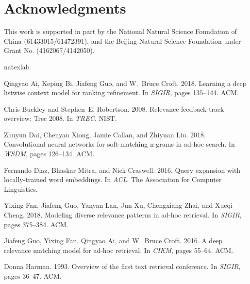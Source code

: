 \documentclass[11pt,a4paper]{article}
\begin{document}
\section*{Acknowledgments}
This work is supported in part by the National Natural Science Foundation of China (61433015/61472391), and the Beijing Natural Science Foundation under Grant No. (4162067/4142050).


\begin{thebibliography}{32}
	\expandafter\ifx\csname natexlab\endcsname\relax\def\natexlab#1{#1}\fi
	
	Qingyao Ai, Keping Bi, Jiafeng Guo, and W.~Bruce Croft. 2018.
	\newblock Learning a deep listwise context model for ranking refinement.
	\newblock In \emph{{SIGIR}}, pages 135--144. {ACM}.
	
	Chris Buckley and Stephen~E. Robertson. 2008.
	\newblock Relevance feedback track overview: Trec 2008.
	\newblock In \emph{{TREC}}. {NIST}.
	
	Zhuyun Dai, Chenyan Xiong, Jamie Callan, and Zhiyuan Liu. 2018.
	\newblock Convolutional neural networks for soft-matching n-grams in ad-hoc
	search.
	\newblock In \emph{{WSDM}}, pages 126--134. {ACM}.
	
	Fernando Diaz, Bhaskar Mitra, and Nick Craswell. 2016.
	\newblock Query expansion with locally-trained word embeddings.
	\newblock In \emph{{ACL}}. The Association for Computer Linguistics.
	
	Yixing Fan, Jiafeng Guo, Yanyan Lan, Jun Xu, Chengxiang Zhai, and Xueqi Cheng.
	2018.
	\newblock Modeling diverse relevance patterns in ad-hoc retrieval.
	\newblock In \emph{{SIGIR}}, pages 375--384. {ACM}.
	
	Jiafeng Guo, Yixing Fan, Qingyao Ai, and W.~Bruce Croft. 2016.
	\newblock A deep relevance matching model for ad-hoc retrieval.
	\newblock In \emph{{CIKM}}, pages 55--64. {ACM}.
	
	Donna Harman. 1993.
	\newblock Overview of the first text retrieval conference.
	\newblock In \emph{{SIGIR}}, pages 36--47. {ACM}.
	

\end{thebibliography}
\end{document}
